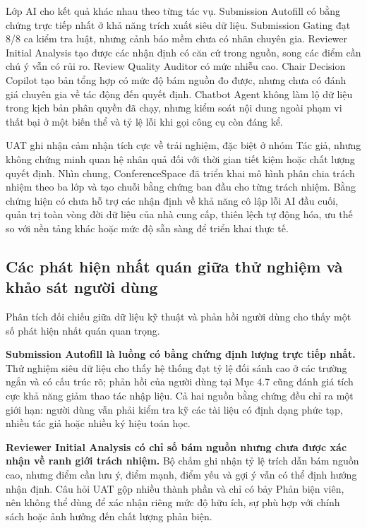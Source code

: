 Lớp AI cho kết quả khác nhau theo từng tác vụ. Submission Autofill có bằng chứng trực tiếp nhất ở khả năng trích xuất siêu dữ liệu. Submission Gating đạt 8/8 ca kiểm tra luật, nhưng cảnh báo mềm chưa có nhãn chuyên gia. Reviewer Initial Analysis tạo được các nhận định có căn cứ trong nguồn, song các điểm cần chú ý vẫn có rủi ro. Review Quality Auditor có mức nhiễu cao. Chair Decision Copilot tạo bản tổng hợp có mức độ bám nguồn đo được, nhưng chưa có đánh giá chuyên gia về tác động đến quyết định. Chatbot Agent không làm lộ dữ liệu trong kịch bản phân quyền đã chạy, nhưng kiểm soát nội dung ngoài phạm vi thất bại ở một biến thể và tỷ lệ lỗi khi gọi công cụ còn đáng kể.

UAT ghi nhận cảm nhận tích cực về trải nghiệm, đặc biệt ở nhóm Tác giả, nhưng không chứng minh quan hệ nhân quả đối với thời gian tiết kiệm hoặc chất lượng quyết định. Nhìn chung, ConferenceSpace đã triển khai mô hình phân chia trách nhiệm theo ba lớp và tạo chuỗi bằng chứng ban đầu cho từng trách nhiệm. Bằng chứng hiện có chưa hỗ trợ các nhận định về khả năng cô lập lỗi AI đầu cuối, quản trị toàn vòng đời dữ liệu của nhà cung cấp, thiên lệch tự động hóa, ưu thế so với nền tảng khác hoặc mức độ sẵn sàng để triển khai thực tế.

\subsection{Các phát hiện nhất quán giữa thử nghiệm và khảo sát người dùng}

Phân tích đối chiếu giữa dữ liệu kỹ thuật và phản hồi người dùng cho thấy một số phát hiện nhất quán quan trọng.

\textbf{Submission Autofill là luồng có bằng chứng định lượng trực tiếp nhất.} Thử nghiệm siêu dữ liệu cho thấy hệ thống đạt tỷ lệ đối sánh cao ở các trường ngắn và có cấu trúc rõ; phản hồi của người dùng tại Mục 4.7 cũng đánh giá tích cực khả năng giảm thao tác nhập liệu. Cả hai nguồn bằng chứng đều chỉ ra một giới hạn: người dùng vẫn phải kiểm tra kỹ các tài liệu có định dạng phức tạp, nhiều tác giả hoặc nhiều ký hiệu toán học.

\textbf{Reviewer Initial Analysis có chỉ số bám nguồn nhưng chưa được xác nhận về ranh giới trách nhiệm.} Bộ chấm ghi nhận tỷ lệ trích dẫn bám nguồn cao, nhưng điểm cần lưu ý, điểm mạnh, điểm yếu và gợi ý vẫn có thể định hướng nhận định. Câu hỏi UAT gộp nhiều thành phần và chỉ có bảy Phản biện viên, nên không thể dùng để xác nhận riêng mức độ hữu ích, sự phù hợp với chính sách hoặc ảnh hưởng đến chất lượng phản biện.

